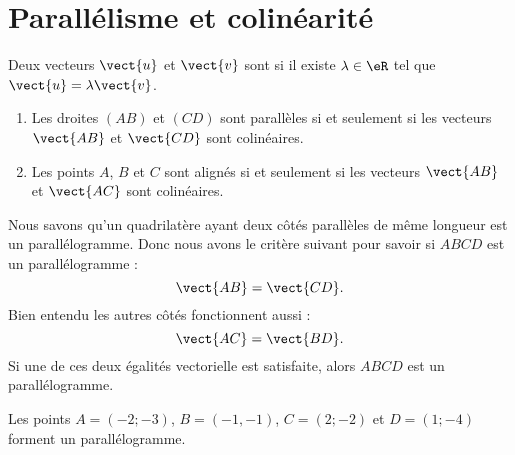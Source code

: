 
\section{Parallélisme et colinéarité}

\begin{definition}
    Deux vecteurs \( \vect{ u }\) et \( \vect{ v }\) sont  si il existe \( \lambda\in \eR\) tel que \( \vect{ u }=\lambda\vect{ v }\).
\end{definition}

\begin{propriete}
    \begin{enumerate}
        \item
            Les droites \( (AB)\) et \( (CD)\) sont parallèles si et seulement si les vecteurs \( \vect{ AB }\) et \( \vect{ CD }\) sont colinéaires.
        \item
            Les points \( A\), \( B\) et \( C\) sont alignés si et seulement si les vecteurs \( \vect{ AB }\) et \( \vect{ AC }\) sont colinéaires.
    \end{enumerate}
\end{propriete}

Nous savons qu'un quadrilatère ayant deux côtés parallèles de même longueur est un parallélogramme. Donc nous avons le critère suivant pour savoir si \( ABCD\) est un parallélogramme :
\begin{equation}
    \vect{ AB }=\vect{ CD }.
\end{equation}
Bien entendu les autres côtés fonctionnent aussi :
\begin{equation}
    \vect{ AC }=\vect{ BD }.
\end{equation}
Si une de ces deux égalités vectorielle est satisfaite, alors \( ABCD\) est un parallélogramme.

\begin{example}
    Les points \( A=(-2;-3)\), \( B=(-1,-1)\), \( C=(2;-2)\) et \( D=(1;-4)\) forment un parallélogramme.
\end{example}

